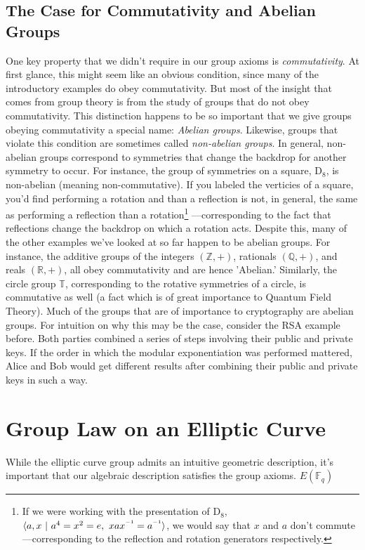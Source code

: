 \documentclass[11pt,a4paper]{article}
\newcommand{\inv}{^{\raisebox{.2em}{$\scriptscriptstyle-1$}}}
\newcommand{\reals}{\mathbb{R}}
\newcommand{\field}{\mathbb{F}}
\begin{document}
\subsection{The Case for Commutativity and Abelian Groups}
One key property that we didn't require in our group axioms is \textit{commutativity}. At first glance, this might seem like an obvious condition, since many of the introductory examples do obey commutativity. But most of the insight that comes from group theory is from the study of groups that do not obey commutativity. This distinction happens to be so important that we give groups obeying commutativity a special name: \textit{Abelian groups}.\autocite[17]{dummit} Likewise, groups that violate this condition are sometimes called \textit{non-abelian groups}. In general, non-abelian groups correspond to symmetries that change the backdrop for another symmetry to occur. For instance, the group of symmetries on a square, $\mathrm{D}_8$, is non-abelian (meaning non-commutative). If you labeled the verticies of a square, you'd find performing a rotation and than a reflection is not, in general, the same as performing a reflection than a rotation\footnote[2]{If we were working with the presentation of $\mathrm{D}_8$, $\langle a,x\ \vert \ a^4 = x^2 = e,\ xax\inv = a\inv \rangle$, we would say that $x$ and $a$ don't commute—corresponding to the reflection and rotation generators respectively.}
—corresponding to the fact that reflections change the backdrop on which a rotation acts. Despite this, many of the other examples we've looked at so far happen to be abelian groups. For instance, the additive groups of the integers $(\mathbb{Z},+)$, rationals $(\mathbb{Q},+)$, and reals $(\reals, +)$, all obey commutativity and are hence 'Abelian.' Similarly, the circle group $\mathbb{T}$, corresponding to the rotative symmetries of a circle, is commutative as well (a fact which is of great importance to Quantum Field Theory).
  Much of the groups that are of importance to cryptography are abelian groups. For intuition on why this may be the case, consider the RSA example before. Both parties combined a series of steps involving their public and private keys. If the order in which the modular exponentiation was performed mattered, Alice and Bob would get different results after combining their public and private keys in such a way.

\section{Group Law on an Elliptic Curve}
While the elliptic curve group admits an intuitive geometric description, it's important that our algebraic description satisfies the group axioms.  $ E(\field_{q} )$ 
\autocite[10]{koblitz}

\newpage 

\printbibliography
\end{document}
